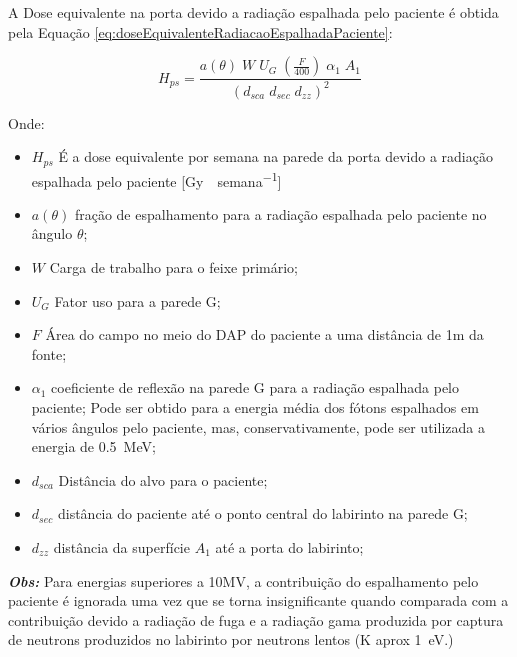 \documentclass[11pt,a4paper]{article}
\begin{document}
            
            A Dose equivalente na porta devido a radiação espalhada pelo paciente é obtida pela Equação \ref{eq:doseEquivalenteRadiacaoEspalhadaPaciente}:

                \begin{equation}
                    H_{ps} = \frac{a(\theta) \; W \; U_G \; \left(\frac{F}{400}\right) \; \alpha_1 \; A_1}{\left(d_{sca} \; d_{sec} \; d_{zz}\right)^2}
                    \label{eq:doseEquivalenteRadiacaoEspalhadaPaciente}
                \end{equation}

            Onde:

                \begin{itemize}
                    \item $H_{ps}$ É a dose equivalente por semana na parede da porta devido a radiação espalhada pelo paciente [\unit{Gy \; semana^{-1}}]
                    \item $a(\theta)$   fração de espalhamento para a radiação espalhada pelo paciente no ângulo $\theta$;
                    \item $W$ Carga de trabalho para o feixe primário;
                    \item $U_G$ Fator uso para a parede G;
                    \item $F$ Área do campo no meio do DAP do paciente a uma distância de 1m da fonte;
                    \item $\alpha_1$ coeficiente de reflexão na parede G para a radiação espalhada pelo paciente; Pode ser obtido para a energia média dos fótons espalhados em vários ângulos pelo paciente, mas, conservativamente, pode ser utilizada a energia de \qty{0.5}{MeV};
                    \item $d_{sca}$ Distância do alvo para o paciente;
                    \item $d_{sec}$ distância do paciente até o ponto central do labirinto na parede G;
                    \item $d_{zz}$ distância da superfície $A_1$ até a porta do labirinto;
                \end{itemize} 
            
            \textbf{\textit{\textcolor{CarnationPink}{Obs:}}} Para energias superiores a 10MV, a contribuição do espalhamento pelo paciente é ignorada uma vez que se torna insignificante quando comparada com a contribuição devido a radiação de fuga e a radiação gama produzida por captura de neutrons produzidos no labirinto por neutrons lentos (K aprox \qty{1}{eV}.)
\end{document}
